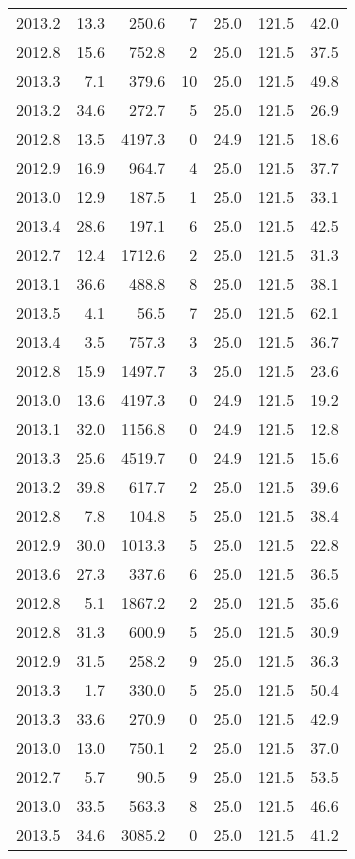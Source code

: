 \begin{tabular}{rrrrrrr}
2013.2 & 13.3 & 250.6 & 7 & 25.0 & 121.5 & 42.0 \\
2012.8 & 15.6 & 752.8 & 2 & 25.0 & 121.5 & 37.5 \\
2013.3 & 7.1 & 379.6 & 10 & 25.0 & 121.5 & 49.8 \\
2013.2 & 34.6 & 272.7 & 5 & 25.0 & 121.5 & 26.9 \\
2012.8 & 13.5 & 4197.3 & 0 & 24.9 & 121.5 & 18.6 \\
2012.9 & 16.9 & 964.7 & 4 & 25.0 & 121.5 & 37.7 \\
2013.0 & 12.9 & 187.5 & 1 & 25.0 & 121.5 & 33.1 \\
2013.4 & 28.6 & 197.1 & 6 & 25.0 & 121.5 & 42.5 \\
2012.7 & 12.4 & 1712.6 & 2 & 25.0 & 121.5 & 31.3 \\
2013.1 & 36.6 & 488.8 & 8 & 25.0 & 121.5 & 38.1 \\
2013.5 & 4.1 & 56.5 & 7 & 25.0 & 121.5 & 62.1 \\
2013.4 & 3.5 & 757.3 & 3 & 25.0 & 121.5 & 36.7 \\
2012.8 & 15.9 & 1497.7 & 3 & 25.0 & 121.5 & 23.6 \\
2013.0 & 13.6 & 4197.3 & 0 & 24.9 & 121.5 & 19.2 \\
2013.1 & 32.0 & 1156.8 & 0 & 24.9 & 121.5 & 12.8 \\
2013.3 & 25.6 & 4519.7 & 0 & 24.9 & 121.5 & 15.6 \\
2013.2 & 39.8 & 617.7 & 2 & 25.0 & 121.5 & 39.6 \\
2012.8 & 7.8 & 104.8 & 5 & 25.0 & 121.5 & 38.4 \\
2012.9 & 30.0 & 1013.3 & 5 & 25.0 & 121.5 & 22.8 \\
2013.6 & 27.3 & 337.6 & 6 & 25.0 & 121.5 & 36.5 \\
2012.8 & 5.1 & 1867.2 & 2 & 25.0 & 121.5 & 35.6 \\
2012.8 & 31.3 & 600.9 & 5 & 25.0 & 121.5 & 30.9 \\
2012.9 & 31.5 & 258.2 & 9 & 25.0 & 121.5 & 36.3 \\
2013.3 & 1.7 & 330.0 & 5 & 25.0 & 121.5 & 50.4 \\
2013.3 & 33.6 & 270.9 & 0 & 25.0 & 121.5 & 42.9 \\
2013.0 & 13.0 & 750.1 & 2 & 25.0 & 121.5 & 37.0 \\
2012.7 & 5.7 & 90.5 & 9 & 25.0 & 121.5 & 53.5 \\
2013.0 & 33.5 & 563.3 & 8 & 25.0 & 121.5 & 46.6 \\
2013.5 & 34.6 & 3085.2 & 0 & 25.0 & 121.5 & 41.2 \\

\end{tabular}
